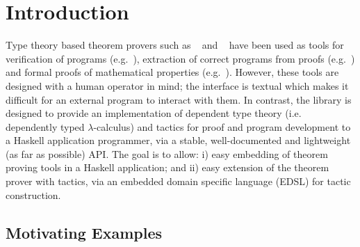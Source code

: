 \section{Introduction}


Type theory based theorem provers such as \Coq{}~\cite{coq-manual} and
\Agda{}~\cite{agda} have been used as tools for verification of programs
(e.g.~\cite{leroy-compiler,why-tool,mckinna-expr}), extraction of
correct programs from proofs (e.g.~\cite{extraction-coq,large-extraction})
and formal proofs of mathematical properties
(e.g.~\cite{fta,four-colour}).  However, these tools are designed with a
human operator in mind; the interface is textual which makes it
difficult for an external program to interact with them. 
In contrast, the \Ivor{} library is designed to provide an
implementation of dependent type theory (i.e. dependently typed
$\lambda$-calculus) and tactics for proof and
program development to a Haskell application programmer, via a stable,
well-documented and lightweight (as far as possible) API. The goal is
to allow: i) easy embedding of theorem proving tools in a Haskell
application; and ii) easy extension of the theorem prover with
 tactics, via an embedded domain specific
language (EDSL) for tactic construction.





\subsection{Motivating Examples}

